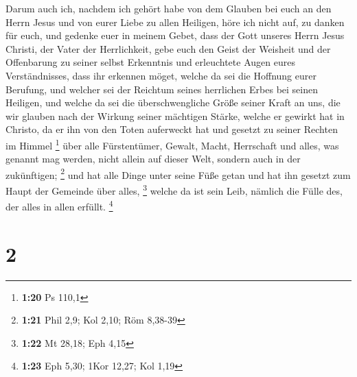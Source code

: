  Darum auch ich, nachdem ich gehört habe von dem Glauben
bei euch an den Herrn Jesus und von eurer Liebe zu allen Heiligen,
 höre ich nicht auf, zu danken für euch, und gedenke euer
in meinem Gebet,  dass der Gott unseres Herrn Jesus
Christi, der Vater der Herrlichkeit, gebe euch den Geist der Weisheit
und der Offenbarung zu seiner selbst Erkenntnis  und
erleuchtete Augen eures Verständnisses, dass ihr erkennen möget, welche
da sei die Hoffnung eurer Berufung, und welcher sei der Reichtum seines
herrlichen Erbes bei seinen Heiligen,  und welche da sei
die überschwengliche Größe seiner Kraft an uns, die wir glauben nach der
Wirkung seiner mächtigen Stärke,  welche er gewirkt hat
in Christo, da er ihn von den Toten auferweckt hat und gesetzt zu seiner
Rechten im Himmel \footnote{\textbf{1:20} Ps 110,1}  über
alle Fürstentümer, Gewalt, Macht, Herrschaft und alles, was genannt mag
werden, nicht allein auf dieser Welt, sondern auch in der zukünftigen;
\footnote{\textbf{1:21} Phil 2,9; Kol 2,10; Röm 8,38-39} 
und hat alle Dinge unter seine Füße getan und hat ihn gesetzt zum Haupt
der Gemeinde über alles, \footnote{\textbf{1:22} Mt 28,18; Eph 4,15}
 welche da ist sein Leib, nämlich die Fülle des, der
alles in allen erfüllt. \footnote{\textbf{1:23} Eph 5,30; 1Kor 12,27;
  Kol 1,19}

\hypertarget{section-1}{%
\section{2}\label{section-1}}


